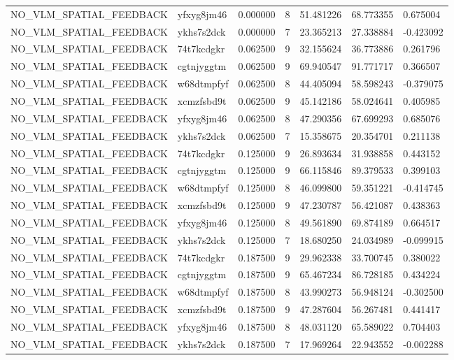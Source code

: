 \begin{tabular}{lllllll}
NO\_VLM\_SPATIAL\_FEEDBACK & yfxyg8jm46 & 0.000000 & 8 & 51.481226 & 68.773355 & 0.675004 \\
NO\_VLM\_SPATIAL\_FEEDBACK & ykhs7s2dck & 0.000000 & 7 & 23.365213 & 27.338884 & -0.423092 \\
NO\_VLM\_SPATIAL\_FEEDBACK & 74t7kcdgkr & 0.062500 & 9 & 32.155624 & 36.773886 & 0.261796 \\
NO\_VLM\_SPATIAL\_FEEDBACK & cgtnjyggtm & 0.062500 & 9 & 69.940547 & 91.771717 & 0.366507 \\
NO\_VLM\_SPATIAL\_FEEDBACK & w68dtmpfyf & 0.062500 & 8 & 44.405094 & 58.598243 & -0.379075 \\
NO\_VLM\_SPATIAL\_FEEDBACK & xcmzfsbd9t & 0.062500 & 9 & 45.142186 & 58.024641 & 0.405985 \\
NO\_VLM\_SPATIAL\_FEEDBACK & yfxyg8jm46 & 0.062500 & 8 & 47.290356 & 67.699293 & 0.685076 \\
NO\_VLM\_SPATIAL\_FEEDBACK & ykhs7s2dck & 0.062500 & 7 & 15.358675 & 20.354701 & 0.211138 \\
NO\_VLM\_SPATIAL\_FEEDBACK & 74t7kcdgkr & 0.125000 & 9 & 26.893634 & 31.938858 & 0.443152 \\
NO\_VLM\_SPATIAL\_FEEDBACK & cgtnjyggtm & 0.125000 & 9 & 66.115846 & 89.379533 & 0.399103 \\
NO\_VLM\_SPATIAL\_FEEDBACK & w68dtmpfyf & 0.125000 & 8 & 46.099800 & 59.351221 & -0.414745 \\
NO\_VLM\_SPATIAL\_FEEDBACK & xcmzfsbd9t & 0.125000 & 9 & 47.230787 & 56.421087 & 0.438363 \\
NO\_VLM\_SPATIAL\_FEEDBACK & yfxyg8jm46 & 0.125000 & 8 & 49.561890 & 69.874189 & 0.664517 \\
NO\_VLM\_SPATIAL\_FEEDBACK & ykhs7s2dck & 0.125000 & 7 & 18.680250 & 24.034989 & -0.099915 \\
NO\_VLM\_SPATIAL\_FEEDBACK & 74t7kcdgkr & 0.187500 & 9 & 29.962338 & 33.700745 & 0.380022 \\
NO\_VLM\_SPATIAL\_FEEDBACK & cgtnjyggtm & 0.187500 & 9 & 65.467234 & 86.728185 & 0.434224 \\
NO\_VLM\_SPATIAL\_FEEDBACK & w68dtmpfyf & 0.187500 & 8 & 43.990273 & 56.948124 & -0.302500 \\
NO\_VLM\_SPATIAL\_FEEDBACK & xcmzfsbd9t & 0.187500 & 9 & 47.287604 & 56.267481 & 0.441417 \\
NO\_VLM\_SPATIAL\_FEEDBACK & yfxyg8jm46 & 0.187500 & 8 & 48.031120 & 65.589022 & 0.704403 \\
NO\_VLM\_SPATIAL\_FEEDBACK & ykhs7s2dck & 0.187500 & 7 & 17.969264 & 22.943552 & -0.002288 \\

\end{tabular}

